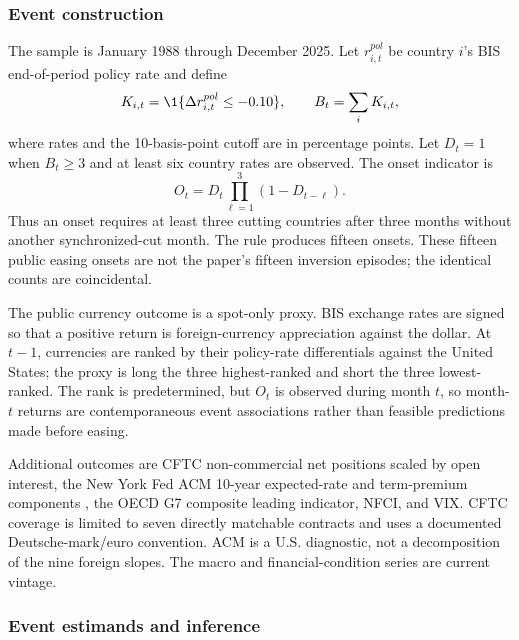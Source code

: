 \subsubsection{Event construction}

The sample is January 1988 through December 2025. Let $r^{pol}_{i,t}$ be country $i$'s BIS end-of-period policy rate and define
\begin{equation}
K_{i,t}=\1\{\Delta r^{pol}_{i,t}\leq-0.10\},
\qquad
B_t=\sum_iK_{i,t},
\label{eq:public-cuts}
\end{equation}
where rates and the 10-basis-point cutoff are in percentage points. Let $D_t=1$ when $B_t\geq3$ and at least six country rates are observed. The onset indicator is
\begin{equation}
O_t=D_t\prod_{\ell=1}^{3}(1-D_{t-\ell}).
\label{eq:public-onset}
\end{equation}
Thus an onset requires at least three cutting countries after three months without another synchronized-cut month. The rule produces fifteen onsets. These fifteen public easing onsets are not the paper's fifteen inversion episodes; the identical counts are coincidental.

The public currency outcome is a spot-only proxy. BIS exchange rates are signed so that a positive return is foreign-currency appreciation against the dollar. At $t-1$, currencies are ranked by their policy-rate differentials against the United States; the proxy is long the three highest-ranked and short the three lowest-ranked. The rank is predetermined, but $O_t$ is observed during month $t$, so month-$t$ returns are contemporaneous event associations rather than feasible predictions made before easing.

Additional outcomes are CFTC non-commercial net positions scaled by open interest, the New York Fed ACM 10-year expected-rate and term-premium components \citep{adrian2013}, the OECD G7 composite leading indicator, NFCI, and VIX. CFTC coverage is limited to seven directly matchable contracts and uses a documented Deutsche-mark/euro convention. ACM is a U.S. diagnostic, not a decomposition of the nine foreign slopes. The macro and financial-condition series are current vintage.

\subsubsection{Event estimands and inference}

